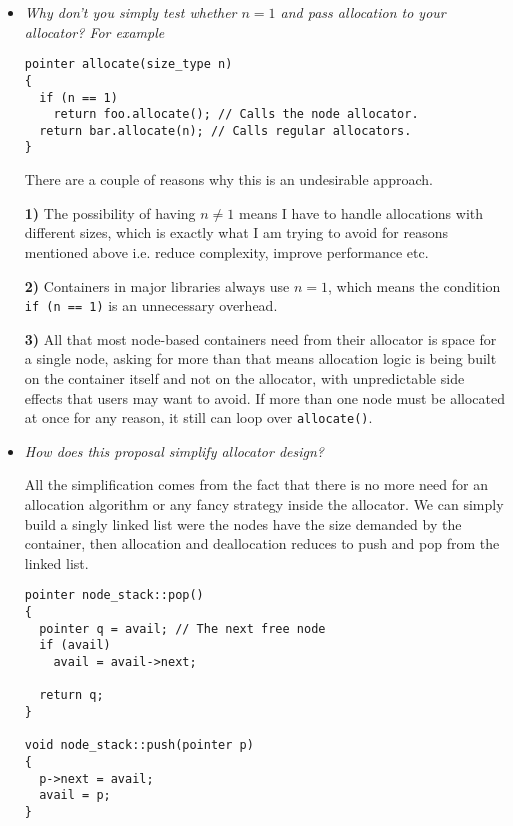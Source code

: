 \documentclass[11pt]{article}
\begin{document}
\begin{itemize}
\item {\it Why don't you simply test whether $n = 1$ and pass
allocation to your allocator? For example}
\medskip
\begin{lstlisting}
pointer allocate(size_type n)
{
  if (n == 1)
    return foo.allocate(); // Calls the node allocator.
  return bar.allocate(n); // Calls regular allocators.
}
\end{lstlisting}

\noindent
There are a couple of reasons why this is an undesirable approach.

{\bf 1) } The possibility of having $n \ne 1$ means I have to handle
allocations with different sizes, which is exactly what I am
trying to avoid for reasons mentioned above i.e. reduce
complexity, improve performance etc.

\medskip
\noindent
{\bf 2) } Containers in major libraries always use $n = 1$, which
means the condition \texttt{if (n == 1)} is an unnecessary
overhead.

\medskip
\noindent
{\bf 3) } All that most node-based containers need from their allocator
is space for a single node, asking for more than that means
allocation logic is being built on the container itself and not on
the allocator, with unpredictable side effects that users may
want to avoid. If more than one node must be allocated at once for any
reason, it still can loop over \texttt{allocate()}.

\item {\it How does this proposal simplify allocator design?}

\medskip
\noindent
All the simplification comes from the fact that there is no more
need for an allocation algorithm or any fancy strategy inside the
allocator. We can simply build a singly linked list were the
nodes have the size demanded by the container, then allocation
and deallocation reduces to push and pop from the linked list.

\medskip
\begin{lstlisting}
pointer node_stack::pop()
{
  pointer q = avail; // The next free node
  if (avail)
    avail = avail->next;

  return q;
}

void node_stack::push(pointer p)
{
  p->next = avail;
  avail = p;
}

\end{lstlisting}
\end{itemize}
\end{document}
